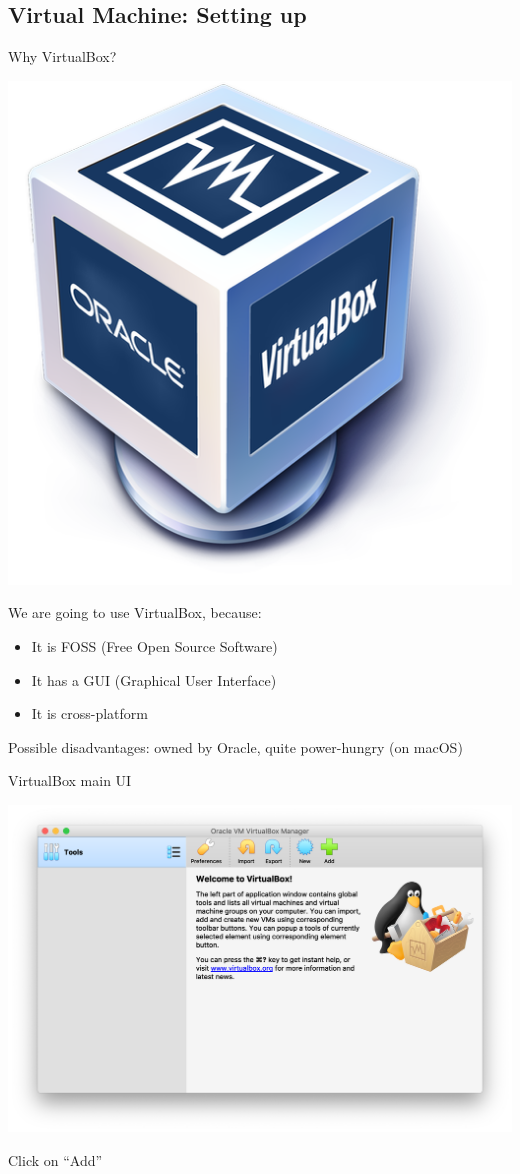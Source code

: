 \documentclass[12pt]{beamer}
\begin{document}
\subsection{Virtual Machine: Setting up}
\begin{frame}{Why VirtualBox?}
  \begin{center}
    \includegraphics[width=0.25\linewidth]{virtualbox}
  \end{center}

  We are going to use VirtualBox, because:
  \begin{itemize}
    \item It is FOSS (Free Open Source Software)
    \item It has a GUI (Graphical User Interface)
    \item It is cross-platform
  \end{itemize}

  Possible disadvantages: owned by Oracle, quite power-hungry (on macOS)
\end{frame}

\begin{frame}{VirtualBox main UI}
  \begin{center}
    \includegraphics[width=0.8\linewidth]{vb-main}
  \end{center}
  Click on ``Add''
\end{frame}
\end{document}
